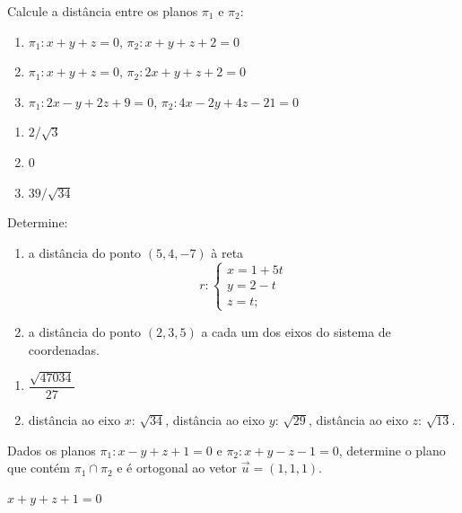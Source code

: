 \documentclass[12pt]{exam}
\begin{document}
\begin{exercicio}
    Calcule a distância entre os planos $\pi_1$ e $\pi_2$:
    \begin{enumerate}[label=({\alph*})]
        \item $\pi_1 : x + y + z = 0$, $\pi_2 : x + y + z + 2 = 0$
        \item $\pi_1 : x + y + z = 0$, $\pi_2 : 2x + y + z + 2 = 0$
        \item $\pi_1 : 2x - y + 2z + 9 = 0$, $\pi_2 : 4x - 2y + 4z - 21 = 0$
    \end{enumerate}
    \begin{solucao}
        \begin{enumerate}[label=({\alph*})]
            \item $2/\sqrt{3}$
            \item 0
            \item $39/\sqrt{34}$
        \end{enumerate}
    \end{solucao}
\end{exercicio}

\begin{exercicio}
    Determine:
    \begin{enumerate}[label=({\alph*})]
        \item a distância do ponto $(5,4,-7)$ à reta
              \[
                  r: \begin{cases}
                      x = 1 + 5t \\
                      y = 2 - t  \\
                      z = t;
                  \end{cases}
              \]
        \item a distância do ponto $(2,3,5)$ a cada um dos eixos do sistema de coordenadas.
    \end{enumerate}
    \begin{solucao}
        \begin{enumerate}[label=({\alph*})]
            \item $\dfrac{\sqrt{47034}}{27}$
            \item distância ao eixo $x$: $\sqrt{34}$, distância ao eixo $y$: $\sqrt{29}$, distância ao eixo $z$: $\sqrt{13}$.
        \end{enumerate}
    \end{solucao}
\end{exercicio}

\begin{exercicio}
    Dados os planos $\pi_1 : x - y + z + 1 = 0$ e $\pi_2 : x + y - z - 1 = 0$, determine o plano que contém $\pi_1\cap\pi_2$ e é ortogonal ao vetor $\vec{u} = (1,1,1)$.
    \begin{solucao}
        $x + y + z + 1 = 0$
    \end{solucao}
\end{exercicio}
\end{document}
